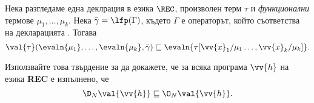 \begin{problem}
  Нека разгледаме една деклрация  в езика $\REC$, произволен терм $\tau$ и {\em функционални} термове $\mu_1,\dots,\mu_{k}$.
  Нека $\bar{\gamma} = \lfp(\Gamma)$, където $\Gamma$ е операторът, който съответства на декларацията .
  Тогава
  \[\val{\tau}(\evaln{\mu_1},\dots,\evaln{\mu_k},\bar{\gamma}) \sqsubseteq \evaln{\tau[\vv{x}_1/\mu_1\dots,\vv{x}_k/\mu_k]}.\]
  
  Използвайте това твърдение за да докажете, че за всяка програма $\vv{h}$ на езика {\bf REC} е изпълнено,
  че \[\D_N\val{\vv{h}} \sqsubseteq \O_N\val{\vv{h}}.\]
\end{problem}


